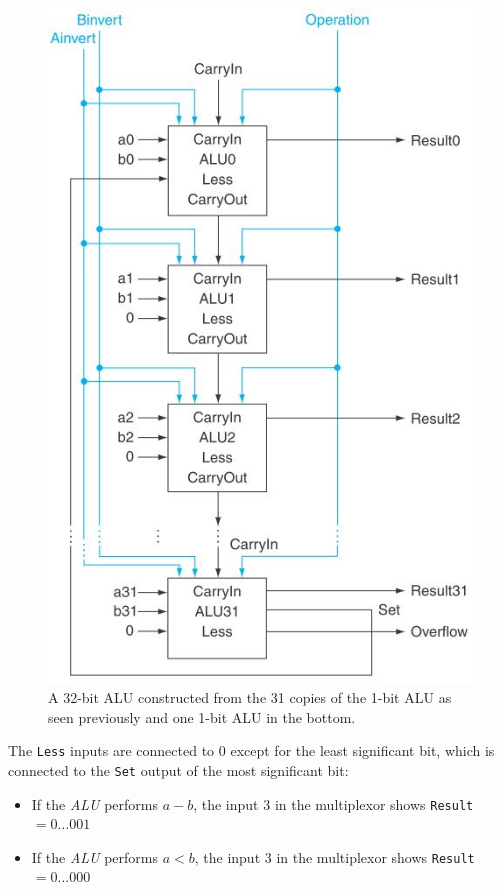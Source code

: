 \documentclass[10pt,a4paper]{article}
\begin{document}
\begin{figure} [h!]
    \centering
    \includegraphics[scale=0.7]{ALU 2.JPG}
    \caption{ A 32-bit ALU constructed from the 31 copies of the 1-bit ALU as seen previously and one 1-bit ALU in the bottom.}
\end{figure}

The \texttt{Less} inputs are connected to $0$ except for the least significant bit, which is
connected to the \texttt{Set} output of the most significant bit:
\begin{itemize}
    \item If the \textit{ALU} performs $a - b$, the input 3 in the multiplexor shows \texttt{Result}$=0\dots 001$
    \item If the \textit{ALU} performs $a < b$, the input 3 in the multiplexor shows \texttt{Result}$=0\dots 000$
\end{itemize} 
\end{document}

